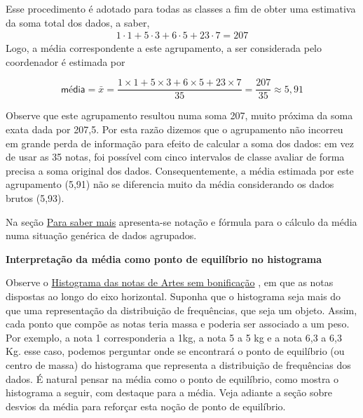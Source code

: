 Esse procedimento é adotado para todas as classes a fim de obter uma estimativa da soma total dos dados, a saber,
\begin{equation*}
\begin{split}1\cdot 1+5\cdot 3+6\cdot 5+23\cdot 7=207\end{split}
\end{equation*}
Logo, a média correspondente a este agrupamento, a ser considerada pelo coordenador é estimada por

\begin{equation*}
\textsf{média}=\bar{x}=\frac{1\times 1+5\times 3+6\times 5+23\times 7}{35}=\frac{207}{35}\approx 5,91
\end{equation*}

Observe que este agrupamento resultou numa soma 207, muito próxima da soma exata dada por 207,5. Por esta razão dizemos que o agrupamento não incorreu em grande perda de informação para efeito de calcular a soma dos dados: em vez de usar as 35 notas, foi possível com cinco intervalos de classe avaliar de forma precisa a soma original dos dados. Consequentemente, a média estimada por este agrupamento (5,91) não se diferencia muito da média considerando os dados brutos (5,93).

Na seção \hyperref[\detokenize{PE104-A:sec-para-saber-mais}]{Para saber mais} apresenta-se notação e fórmula para o cálculo da média numa situação genérica de dados agrupados.

\textbf{Interpretação da média como ponto de equilíbrio no histograma}

Observe o \hyperref[\detokenize{PE104-0:fig-histograma-notas-sem-bonificacao}]{Histograma das notas de Artes sem bonificação} , em que as notas dispostas ao longo do eixo horizontal. Suponha que o histograma seja mais do que uma representação da distribuição de frequências, que seja um objeto. Assim, cada ponto que compõe as notas teria massa e poderia ser associado a um peso.  Por exemplo, a nota 1 corresponderia a 1kg, a nota 5 a 5 kg e a nota 6,3 a 6,3 Kg.  esse caso, podemos perguntar onde se encontrará o ponto de equilíbrio (ou centro de massa) do histograma que representa a distribuição de frequências dos dados. É natural pensar na média como o ponto de equilíbrio, como mostra o histograma a seguir, com destaque para a média. Veja adiante a seção sobre desvios da média para reforçar esta noção de ponto de equilíbrio.
\label{\detokenize{PE104-1:id1}}


